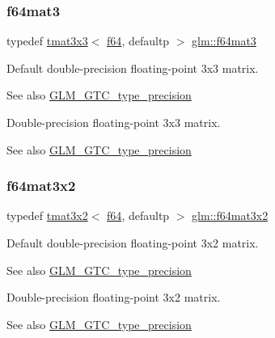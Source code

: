 \subsubsection{\texorpdfstring{f64mat3}{f64mat3}}
{\footnotesize\ttfamily typedef \hyperlink{structglm_1_1tmat3x3}{tmat3x3}$<$ \hyperlink{group__gtc__type__precision_ga2bba392e555124b36cde6abba349bab3}{f64}, defaultp $>$ \hyperlink{group__gtc__type__precision_ga44f23eb3c2e893d0afb1aa2b9e89be76}{glm\+::f64mat3}}

Default double-\/precision floating-\/point 3x3 matrix. \begin{DoxySeeAlso}{See also}
\hyperlink{group__gtc__type__precision}{G\+L\+M\+\_\+\+G\+T\+C\+\_\+type\+\_\+precision}
\end{DoxySeeAlso}
Double-\/precision floating-\/point 3x3 matrix. \begin{DoxySeeAlso}{See also}
\hyperlink{group__gtc__type__precision}{G\+L\+M\+\_\+\+G\+T\+C\+\_\+type\+\_\+precision} 
\end{DoxySeeAlso}
\mbox{\label{group__gtc__type__precision_ga0039ae03558b5242466f4c344c3c7d65}} 
\subsubsection{\texorpdfstring{f64mat3x2}{f64mat3x2}}
{\footnotesize\ttfamily typedef \hyperlink{structglm_1_1tmat3x2}{tmat3x2}$<$ \hyperlink{group__gtc__type__precision_ga2bba392e555124b36cde6abba349bab3}{f64}, defaultp $>$ \hyperlink{group__gtc__type__precision_ga0039ae03558b5242466f4c344c3c7d65}{glm\+::f64mat3x2}}

Default double-\/precision floating-\/point 3x2 matrix. \begin{DoxySeeAlso}{See also}
\hyperlink{group__gtc__type__precision}{G\+L\+M\+\_\+\+G\+T\+C\+\_\+type\+\_\+precision}
\end{DoxySeeAlso}
Double-\/precision floating-\/point 3x2 matrix. \begin{DoxySeeAlso}{See also}
\hyperlink{group__gtc__type__precision}{G\+L\+M\+\_\+\+G\+T\+C\+\_\+type\+\_\+precision} 
\end{DoxySeeAlso}
\mbox{\label{group__gtc__type__precision_gab272e67eb87cc1e8233237480c2aa8d2}} 
